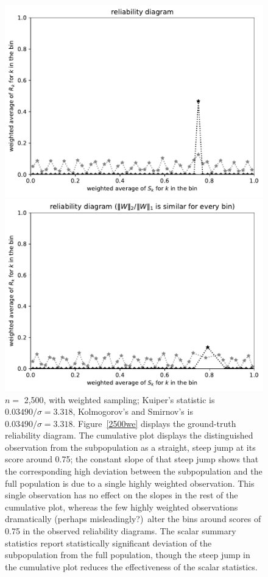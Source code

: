 \documentclass{article}
\begin{document}
\begin{figure}
\begin{centering}
\parbox{\imsize}{\includegraphics[width=\imsize]
                {./codes/weighted/50000_2500_50_3/equiscores.pdf}}
\quad\quad
\parbox{\imsize}{\includegraphics[width=\imsize]
                {./codes/weighted/50000_2500_50_3/equierrs.pdf}}

\end{centering}
\caption{$n =$ 2,500, with weighted sampling;
         Kuiper's statistic is $0.03490 / \sigma = 3.318$,
         Kolmogorov's and Smirnov's is $0.03490 / \sigma = 3.318$.
Figure~\ref{2500we} displays the ground-truth reliability diagram.
The cumulative plot displays the distinguished observation
from the subpopulation as a straight, steep jump at its score around 0.75;
the constant slope of that steep jump shows that the corresponding
high deviation between the subpopulation and the full population
is due to a single highly weighted observation. This single observation has
no effect on the slopes in the rest of the cumulative plot,
whereas the few highly weighted observations dramatically
(perhaps misleadingly?)\
alter the bins around scores of 0.75 in the observed reliability diagrams.
The scalar summary statistics report
statistically significant deviation of the subpopulation
from the full population, though the steep jump in the cumulative plot
reduces the effectiveness of the scalar statistics.
}
\label{2500w}
\end{figure}
\end{document}
